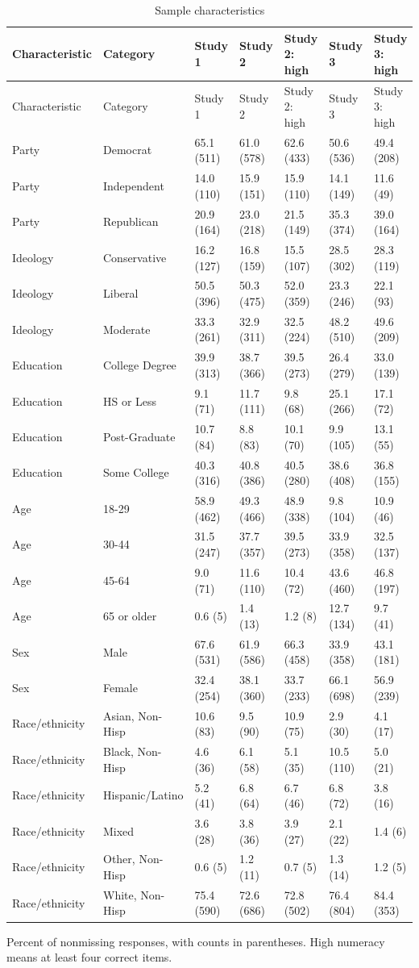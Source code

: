 
\begin{longtable}[t]{lllllll}
\caption{\label{tab:sample}Sample characteristics}\\
\toprule
Characteristic & Category & Study 1 & Study 2 & Study 2: high & Study 3 & Study 3: high\\
\midrule
\endfirsthead
\toprule
Characteristic & Category & Study 1 & Study 2 & Study 2: high & Study 3 & Study 3: high\\
\midrule
\endhead
Party & Democrat & 65.1 (511) & 61.0 (578) & 62.6 (433) & 50.6 (536) & 49.4 (208)\\
Party & Independent & 14.0 (110) & 15.9 (151) & 15.9 (110) & 14.1 (149) & 11.6 (49)\\
Party & Republican & 20.9 (164) & 23.0 (218) & 21.5 (149) & 35.3 (374) & 39.0 (164)\\
Ideology & Conservative & 16.2 (127) & 16.8 (159) & 15.5 (107) & 28.5 (302) & 28.3 (119)\\
Ideology & Liberal & 50.5 (396) & 50.3 (475) & 52.0 (359) & 23.3 (246) & 22.1 (93)\\
Ideology & Moderate & 33.3 (261) & 32.9 (311) & 32.5 (224) & 48.2 (510) & 49.6 (209)\\
Education & College Degree & 39.9 (313) & 38.7 (366) & 39.5 (273) & 26.4 (279) & 33.0 (139)\\
Education & HS or Less & 9.1 (71) & 11.7 (111) & 9.8 (68) & 25.1 (266) & 17.1 (72)\\
Education & Post-Graduate & 10.7 (84) & 8.8 (83) & 10.1 (70) & 9.9 (105) & 13.1 (55)\\
Education & Some College & 40.3 (316) & 40.8 (386) & 40.5 (280) & 38.6 (408) & 36.8 (155)\\
Age & 18-29 & 58.9 (462) & 49.3 (466) & 48.9 (338) & 9.8 (104) & 10.9 (46)\\
Age & 30-44 & 31.5 (247) & 37.7 (357) & 39.5 (273) & 33.9 (358) & 32.5 (137)\\
Age & 45-64 & 9.0 (71) & 11.6 (110) & 10.4 (72) & 43.6 (460) & 46.8 (197)\\
Age & 65 or older & 0.6 (5) & 1.4 (13) & 1.2 (8) & 12.7 (134) & 9.7 (41)\\
Sex & Male & 67.6 (531) & 61.9 (586) & 66.3 (458) & 33.9 (358) & 43.1 (181)\\
Sex & Female & 32.4 (254) & 38.1 (360) & 33.7 (233) & 66.1 (698) & 56.9 (239)\\
Race/ethnicity & Asian, Non-Hisp & 10.6 (83) & 9.5 (90) & 10.9 (75) & 2.9 (30) & 4.1 (17)\\
Race/ethnicity & Black, Non-Hisp & 4.6 (36) & 6.1 (58) & 5.1 (35) & 10.5 (110) & 5.0 (21)\\
Race/ethnicity & Hispanic/Latino & 5.2 (41) & 6.8 (64) & 6.7 (46) & 6.8 (72) & 3.8 (16)\\
Race/ethnicity & Mixed & 3.6 (28) & 3.8 (36) & 3.9 (27) & 2.1 (22) & 1.4 (6)\\
Race/ethnicity & Other, Non-Hisp & 0.6 (5) & 1.2 (11) & 0.7 (5) & 1.3 (14) & 1.2 (5)\\
Race/ethnicity & White, Non-Hisp & 75.4 (590) & 72.6 (686) & 72.8 (502) & 76.4 (804) & 84.4 (353)\\
\bottomrule
\end{longtable}
\noindent\footnotesize Percent of nonmissing responses, with counts in parentheses. High numeracy means at least four correct items.\par\normalsize
